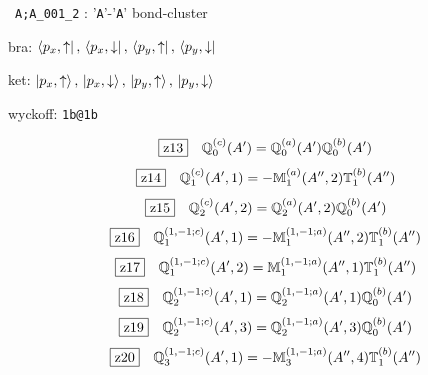 \documentclass[fleqn,10pt,landscape]{jsarticle}
\begin{document}
\noindent\textbullet\, \texttt{A;A_001_2} : '\texttt{A}'-'\texttt{A}' bond-cluster

\noindent\quad * bra: $\bra{p_{x},\uparrow},\, \bra{p_{x},\downarrow},\, \bra{p_{y},\uparrow},\, \bra{p_{y},\downarrow}$

\noindent\quad * ket: $\ket{p_{x},\uparrow},\, \ket{p_{x},\downarrow},\, \ket{p_{y},\uparrow},\, \ket{p_{y},\downarrow}$

\noindent\quad * wyckoff: \texttt{1b@1b}

\begin{dmath*}
\hspace*{3mm}\fbox{z13}\quad \mathbb{Q}_{0}^{(c)}(A^{\prime})=\mathbb{Q}_{0}^{(a)}(A^{\prime}) \mathbb{Q}_{0}^{(b)}(A^{\prime})
\end{dmath*}
\begin{dmath*}
\hspace*{3mm}\fbox{z14}\quad \mathbb{Q}_{1}^{(c)}(A^{\prime},1)=- \mathbb{M}_{1}^{(a)}(A^{\prime\prime},2) \mathbb{T}_{1}^{(b)}(A^{\prime\prime})
\end{dmath*}
\begin{dmath*}
\hspace*{3mm}\fbox{z15}\quad \mathbb{Q}_{2}^{(c)}(A^{\prime},2)=\mathbb{Q}_{2}^{(a)}(A^{\prime},2) \mathbb{Q}_{0}^{(b)}(A^{\prime})
\end{dmath*}
\begin{dmath*}
\hspace*{3mm}\fbox{z16}\quad \mathbb{Q}_{1}^{(1,-1;c)}(A^{\prime},1)=- \mathbb{M}_{1}^{(1,-1;a)}(A^{\prime\prime},2) \mathbb{T}_{1}^{(b)}(A^{\prime\prime})
\end{dmath*}
\begin{dmath*}
\hspace*{3mm}\fbox{z17}\quad \mathbb{Q}_{1}^{(1,-1;c)}(A^{\prime},2)=\mathbb{M}_{1}^{(1,-1;a)}(A^{\prime\prime},1) \mathbb{T}_{1}^{(b)}(A^{\prime\prime})
\end{dmath*}
\begin{dmath*}
\hspace*{3mm}\fbox{z18}\quad \mathbb{Q}_{2}^{(1,-1;c)}(A^{\prime},1)=\mathbb{Q}_{2}^{(1,-1;a)}(A^{\prime},1) \mathbb{Q}_{0}^{(b)}(A^{\prime})
\end{dmath*}
\begin{dmath*}
\hspace*{3mm}\fbox{z19}\quad \mathbb{Q}_{2}^{(1,-1;c)}(A^{\prime},3)=\mathbb{Q}_{2}^{(1,-1;a)}(A^{\prime},3) \mathbb{Q}_{0}^{(b)}(A^{\prime})
\end{dmath*}
\begin{dmath*}
\hspace*{3mm}\fbox{z20}\quad \mathbb{Q}_{3}^{(1,-1;c)}(A^{\prime},1)=- \mathbb{M}_{3}^{(1,-1;a)}(A^{\prime\prime},4) \mathbb{T}_{1}^{(b)}(A^{\prime\prime})
\end{dmath*}
\end{document}
